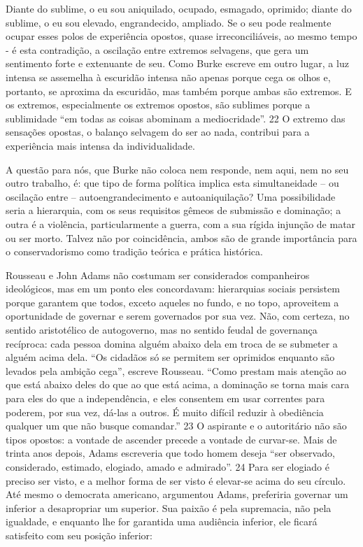 
\par
 
Diante do sublime, o eu sou aniquilado, ocupado, esmagado, oprimido; diante do sublime, o eu sou elevado, engrandecido, ampliado. Se o seu pode realmente ocupar esses polos de experiência opostos, quase irreconciliáveis, ao mesmo tempo - é esta contradição, a oscilação entre extremos selvagens, que gera um sentimento forte e extenuante de seu. Como Burke escreve em outro lugar, a luz intensa se assemelha à escuridão intensa não apenas porque cega os olhos e, portanto, se aproxima da escuridão, mas também porque ambas são extremos. E os extremos, especialmente os extremos opostos, são sublimes porque a sublimidade “em todas as coisas abominam a mediocridade”.
 {\color{blue} 22}  
O extremo das sensações opostas, o balanço selvagem do ser ao nada, contribui para a experiência mais intensa da individualidade.
 
\par
 
A questão para nós, que Burke não coloca nem responde, nem aqui, nem no seu outro trabalho, é: que tipo de forma política implica esta simultaneidade – ou oscilação entre – autoengrandecimento e autoaniquilação? Uma possibilidade seria a hierarquia, com os seus requisitos gêmeos de submissão e dominação; a outra é a violência, particularmente a guerra, com a sua rígida injunção de matar ou ser morto. Talvez não por coincidência, ambos são de grande importância para o conservadorismo como tradição teórica e prática histórica.
 
\par
 
Rousseau e John Adams não costumam ser considerados companheiros ideológicos, mas em um ponto eles concordavam: hierarquias sociais persistem porque garantem que todos, exceto aqueles no fundo, e no topo, aproveitem a oportunidade de governar e serem governados por sua vez. Não, com certeza, no sentido aristotélico de autogoverno, mas no sentido feudal de governança recíproca: cada pessoa domina alguém abaixo dela em troca de se submeter a alguém acima dela. “Os cidadãos só se permitem ser oprimidos enquanto são levados pela ambição cega”, escreve Rousseau. “Como prestam mais atenção ao que está abaixo deles do que ao que está acima, a dominação se torna mais cara para eles do que a independência, e eles consentem em usar correntes para poderem, por sua vez, dá-las a outros. É muito difícil reduzir à obediência qualquer um que não busque comandar.”
 {\color{blue} 23}  
O aspirante e o autoritário não são tipos opostos: a vontade de ascender precede a vontade de curvar-se. Mais de trinta anos depois, Adams escreveria que todo homem deseja “ser observado, considerado, estimado, elogiado, amado e admirado”.
 {\color{blue} 24}  
Para ser elogiado é preciso ser visto, e a melhor forma de ser visto é elevar-se acima do seu círculo. Até mesmo o democrata americano, argumentou Adams, preferiria governar um inferior a desapropriar um superior. Sua paixão é pela supremacia, não pela igualdade, e enquanto lhe for garantida uma audiência inferior, ele ficará satisfeito com seu posição inferior:
 
